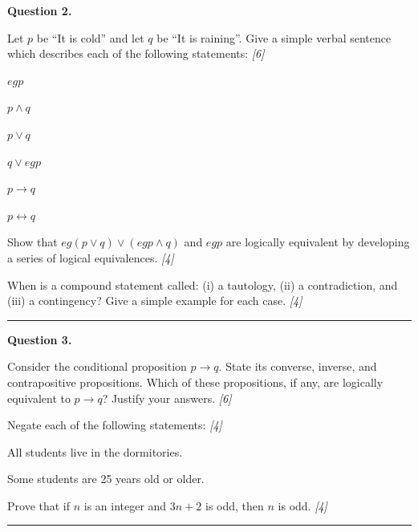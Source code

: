\documentclass[11pt,a4paper]{article}
\newcommand{\pts}[1]{\hfill   \textit{[#1]}}
\begin{document}
\medskip


\noindent   \textbf{Question 2.}

\begin{parts}
  \item Let $p$ be ``It is cold'' and let $q$ be ``It is raining''. Give a simple verbal sentence which describes each of the following statements: \pts{6}
  
\begin{parts}
    \item $
eg p$
    \item $p \land q$
    \item $p \lor q$
    \item $q \lor 
eg p$
    \item $p \rightarrow q$
    \item $p \leftrightarrow q$
  \end{parts}
  \item Show that $
eg(p \lor q) \lor (
eg p \land q)$ and $
eg p$ are logically equivalent by developing a series of logical equivalences. \pts{4}
  \item When is a compound statement called: (i) a tautology, (ii) a contradiction, and (iii) a contingency? Give a simple example for each case. \pts{4}
\end{parts}

\medskip\rule{\linewidth}{0.2pt}

\medskip


\noindent   \textbf{Question 3.}

\begin{parts}
  \item Consider the conditional proposition $p \rightarrow q$. State its converse, inverse, and contrapositive propositions. Which of these propositions, if any, are logically equivalent to $p \rightarrow q$? Justify your answers. \pts{6}
  \item Negate each of the following statements: \pts{4}
  
\begin{parts}
    \item All students live in the dormitories.
    \item Some students are 25 years old or older.
  \end{parts}
  \item Prove that if $n$ is an integer and $3n+2$ is odd, then $n$ is odd. \pts{4}
\end{parts}

\medskip\rule{\linewidth}{0.2pt}
\end{document}
